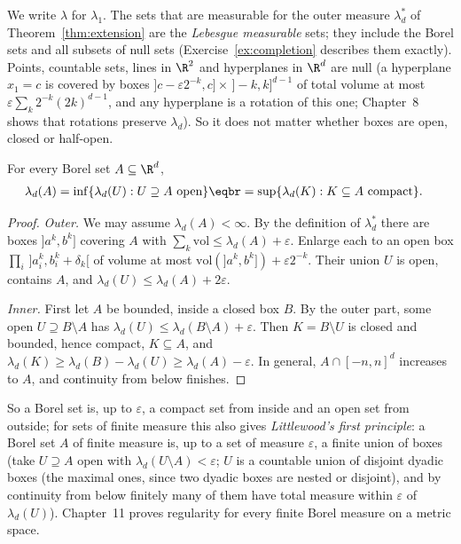 We write $\lambda$ for $\lambda_1$. The sets that are measurable for the outer measure $\lambda_d^*$ of Theorem~\ref{thm:extension} are the \emph{Lebesgue measurable} sets;
they include the Borel sets and all subsets of null sets (Exercise~\ref{ex:completion} describes them exactly). Points, countable sets, lines in $\R^2$
and hyperplanes in $\R^d$ are null (a hyperplane $x_1=c$ is covered by boxes $]c-\varepsilon2^{-k},c]\times\,]-k,k]^{d-1}$ of total volume at most $\varepsilon\sum_k2^{-k}(2k)^{d-1}$, and any hyperplane
is a rotation of this one; Chapter~8 shows that rotations preserve $\lambda_d$). So it does not matter whether boxes are open, closed or half-open.

\begin{proposition}[regularity]\label{prop:regularity}
For every Borel set $A\subseteq\R^d$,
\[\begin{aligned}\lambda_d(A)&=\inf\{\lambda_d(U):U\supseteq A\text{ open}\}\eqbr=\sup\{\lambda_d(K):K\subseteq A\text{ compact}\}.\end{aligned}\]
\end{proposition}
\begin{proof}
\emph{Outer.} We may assume $\lambda_d(A)<\infty$. By the definition of $\lambda_d^*$ there are boxes $]a^k,b^k]$ covering $A$ with $\sum_k\mathrm{vol}\le\lambda_d(A)+\varepsilon$. Enlarge each to an open box
$\prod_i\,]a^k_i,b^k_i+\delta_k[$ of volume at most $\mathrm{vol}(]a^k,b^k])+\varepsilon2^{-k}$. Their union $U$ is open, contains $A$, and $\lambda_d(U)\le\lambda_d(A)+2\varepsilon$.

\emph{Inner.} First let $A$ be bounded, inside a closed box $B$. By the outer part, some open $U\supseteq B\setminus A$ has $\lambda_d(U)\le\lambda_d(B\setminus A)+\varepsilon$. Then $K=B\setminus U$ is closed and
bounded, hence compact, $K\subseteq A$, and $\lambda_d(K)\ge\lambda_d(B)-\lambda_d(U)\ge\lambda_d(A)-\varepsilon$. In general, $A\cap[-n,n]^d$ increases to $A$, and continuity from below finishes.
\end{proof}

So a Borel set is, up to $\varepsilon$, a compact set from inside and an open set from outside; for sets of finite measure this also gives
\emph{Littlewood's first principle}: a Borel set $A$ of finite measure is, up to a set of measure $\varepsilon$, a finite union of boxes (take $U\supseteq A$ open with $\lambda_d(U\setminus A)<\varepsilon$; $U$ is a countable
union of disjoint dyadic boxes (the maximal ones, since two dyadic boxes are nested or disjoint), and by continuity from below finitely many of them have total measure within $\varepsilon$ of $\lambda_d(U)$). Chapter~11 proves regularity for every finite Borel measure on a metric space.

